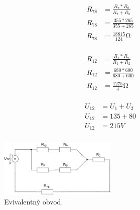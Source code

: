 \documentclass[12pt,a4paper]{article}
\begin{document}
\begin{minipage}{.33\linewidth}
\begin{align*}
        R_{78} &= \frac{R_7 * R_8}{R_7 + R_8} \\[0.5ex]
	R_{78} &= \frac{355 * 265}{355 + 265} \\[0.5ex]
	R_{78} &= \frac{18815}{124} \si{\ohm} \\[0.5ex]
\end{align*}
\end{minipage}%
\begin{minipage}{.33\linewidth}
\begin{align*}
        R_{12} &= \frac{R_1 * R_2}{R_1 + R_2} \\[0.5ex]
	R_{12} &= \frac{680 * 600}{680 + 600} \\[0.5ex]
	R_{12} &= \frac{1275}{4} \si{\ohm} \\[0.5ex]
\end{align*}
\end{minipage}%
\begin{minipage}{.33\linewidth}
\begin{align*}
        U_{12} &= U_1 + U_2 \\[0.5ex]
	U_{12} &= 135 + 80 \\[0.5ex]
	U_{12} &= 215V \\[0.5ex]
\end{align*}
\end{minipage}

\begin{figure}[h]
\centering
\includegraphics[width=0.5\textwidth]{Circuits/1-B.pdf}
\caption{Evivalentný obvod.}
\end{figure}
\end{document}
